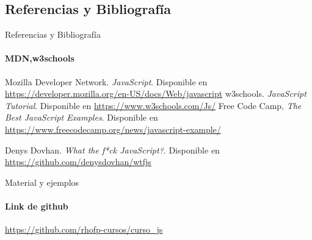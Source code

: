 \documentclass[aspectratio=169]{beamer}
\begin{document}
\begin{darkframes}
    \section*{Referencias y Bibliografía}
    \begin{frame}[label=bibliography]{Referencias y Bibliografía}
      \framesubtitle{MDN,w3schools}
      \begin{thebibliography}{9}
            Mozilla Developer Network.
            \emph{JavaScript}.
            Disponible en \url{https://developer.mozilla.org/en-US/docs/Web/javascript}
            w3schools.
            \emph{JavaScript Tutorial}.
            Disponible en \url{https://www.w3schools.com/Js/}
            Free Code Camp,
            \emph{The Best JavaScript Examples}.
            Disponible en \url{https://www.freecodecamp.org/news/javascript-example/}

            Denys Dovhan.
            \emph{What the f*ck JavaScript?}.
            Disponible en \url{https://github.com/denysdovhan/wtfjs}
      \end{thebibliography}
    \end{frame}

    \begin{frame}{Material y ejemplos}
      \framesubtitle{Link de github}
      \begin{center}
        {\Large
          \url{https://github.com/rhofp-cursos/curso_js}
        }
      \end{center}
    \end{frame}

  \end{darkframes}
\end{document}
